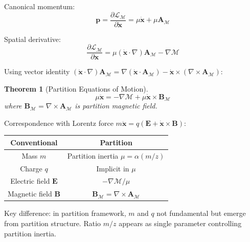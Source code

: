 \documentclass[twocolumn,10pt]{revtex4-2}
\newtheorem{theorem}{Theorem}[section]
\theoremstyle{definition}
\theoremstyle{remark}
\newcommand{\Mdepth}{\mathcal{M}}
\newcommand{\Lagr}{\mathcal{L}}
\newcommand{\Apartition}{\mathbf{A}_{\Mdepth}}
\newcommand{\partinert}{\mu}
\begin{document}
Canonical momentum:
\begin{equation}
\mathbf{p} = \frac{\partial \Lagr_{\Mdepth}}{\partial \dot{\mathbf{x}}} = \partinert\dot{\mathbf{x}} + \partinert\Apartition
\label{eq:canonical_momentum}
\end{equation}

Spatial derivative:
\begin{equation}
\frac{\partial \Lagr_{\Mdepth}}{\partial \mathbf{x}} = \partinert(\dot{\mathbf{x}} \cdot \nabla)\Apartition - \nabla\Mdepth
\label{eq:spatial_derivative}
\end{equation}

Using vector identity $(\dot{\mathbf{x}} \cdot \nabla)\Apartition = \nabla(\dot{\mathbf{x}} \cdot \Apartition) - \dot{\mathbf{x}} \times (\nabla \times \Apartition)$:

\begin{theorem}[Partition Equations of Motion]
\label{thm:eom}
\begin{equation}
\boxed{\partinert\ddot{\mathbf{x}} = -\nabla\Mdepth + \partinert\dot{\mathbf{x}} \times \mathbf{B}_{\Mdepth}}
\label{eq:partition_eom}
\end{equation}
where $\mathbf{B}_{\Mdepth} = \nabla \times \Apartition$ is partition magnetic field.
\end{theorem}

\noindent Correspondence with Lorentz force $m\ddot{\mathbf{x}} = q(\mathbf{E} + \dot{\mathbf{x}} \times \mathbf{B})$:

\begin{center}
\begin{tabular}{cc}
\toprule
\textbf{Conventional} & \textbf{Partition} \\
\midrule
Mass $m$ & Partition inertia $\partinert = \alpha(m/z)$ \\
Charge $q$ & Implicit in $\partinert$ \\
Electric field $\mathbf{E}$ & $-\nabla\Mdepth/\partinert$ \\
Magnetic field $\mathbf{B}$ & $\mathbf{B}_{\Mdepth} = \nabla \times \Apartition$ \\
\bottomrule
\end{tabular}
\end{center}

Key difference: in partition framework, $m$ and $q$ not fundamental but emerge from partition structure. Ratio $m/z$ appears as single parameter controlling partition inertia.

\end{document}
